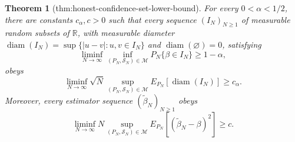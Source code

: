 \documentclass{article}
\newtheorem{theorem}{Theorem}
\begin{document}
\begin{theorem}[thm:honest-confidence-set-lower-bound]\label{thm:honest-confidence-set-lower-bound}
For every \(0<\alpha<1/2\), there are constants \(c_{\alpha},c>0\) such that every sequence \((I_N)_{N\geq 1}\) of measurable random subsets of \(\mathbb R\), with measurable diameter \(\operatorname{diam}(I_N)=\sup\{|u-v|:u,v\in I_N\}\) and \(\operatorname{diam}(\varnothing)=0\), satisfying
\[
 \liminf_{N\to\infty}\inf_{(P_N,\mathcal S_N)\in\mathcal M}
 P_N\{\beta\in I_N\}\geq 1-\alpha,
\]
obeys
\[
 \liminf_{N\to\infty}\sqrt N
 \sup_{(P_N,\mathcal S_N)\in\mathcal M}
 E_{P_N}[\operatorname{diam}(I_N)]\geq c_{\alpha}.
\]
Moreover, every estimator sequence \((\widetilde\beta_N)_{N\geq1}\) obeys
\[
 \liminf_{N\to\infty}N
 \sup_{(P_N,\mathcal S_N)\in\mathcal M}
 E_{P_N}[(\widetilde\beta_N-\beta)^2]\geq c.
\]
\end{theorem}
\end{document}
